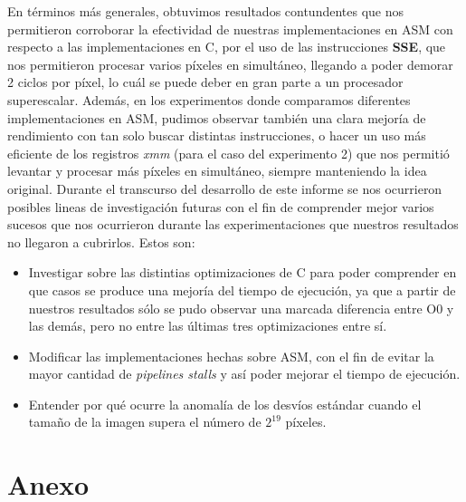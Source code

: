 \documentclass[a4paper]{article}
\begin{document}
\justify
En términos más generales, obtuvimos resultados contundentes que nos permitieron corroborar la efectividad de nuestras implementaciones en ASM con respecto a las implementaciones en C, por el uso de las instrucciones \textbf{SSE}, que nos permitieron procesar varios píxeles en simultáneo, llegando a poder demorar 2 ciclos por píxel, lo cuál se puede deber en gran parte a un procesador superescalar. Además, en los experimentos donde comparamos diferentes implementaciones en ASM, pudimos observar también una clara mejoría de rendimiento con tan solo buscar distintas instrucciones, o hacer un uso más eficiente de los registros \textit{xmm} (para el caso del experimento 2) que nos permitió levantar y procesar más píxeles en simultáneo, siempre manteniendo la idea original. 
\justify
Durante el transcurso del desarrollo de este informe se nos ocurrieron posibles lineas de investigación futuras con el fin de comprender mejor varios sucesos que nos ocurrieron durante las experimentaciones que nuestros resultados no llegaron a cubrirlos. Estos son:
\begin{itemize}
	\item  Investigar sobre las distintias optimizaciones de C para poder comprender en que casos se produce una mejoría del tiempo de ejecución, ya que a partir de nuestros resultados sólo se pudo observar una marcada diferencia entre O0 y las demás, pero no entre las últimas tres optimizaciones entre sí.
	\item Modificar las implementaciones hechas sobre ASM, con el fin de evitar la mayor cantidad de \textit{pipelines stalls} y así poder mejorar el tiempo de ejecución.
	\item Entender por qué ocurre la anomalía de los desvíos estándar cuando el tamaño de la imagen supera el número de $2^{19}$ píxeles.  
\end{itemize}  
\newpage
\section{Anexo}
\end{document}
